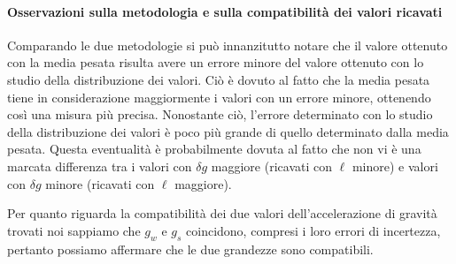 \paragraph{Osservazioni sulla metodologia e sulla compatibilità dei valori ricavati\\}

Comparando le due metodologie si può innanzitutto notare che il valore ottenuto con la media pesata risulta avere un errore minore del valore ottenuto con lo studio della distribuzione dei valori. Ciò è dovuto al fatto che la media pesata tiene in considerazione maggiormente i valori con un errore minore, ottenendo così una misura più precisa. Nonostante ciò, l'errore determinato con lo studio della distribuzione dei valori è poco più grande di quello determinato dalla media pesata. Questa eventualità è probabilmente dovuta al fatto che non vi è una marcata differenza tra i valori con $\delta g$ maggiore (ricavati con $\ell$ minore) e valori con $\delta g$ minore (ricavati con $\ell$ maggiore).

Per quanto riguarda la compatibilità dei due valori dell'accelerazione di gravità trovati noi sappiamo che $g_w$ e $g_s$ coincidono, compresi i loro errori di incertezza, pertanto possiamo affermare che le due grandezze sono compatibili.

%	
